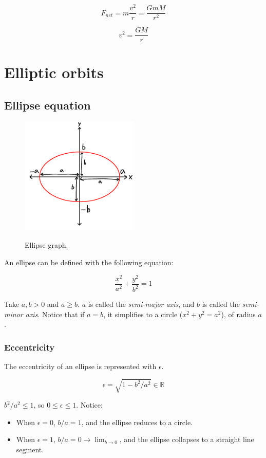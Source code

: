 \documentclass[12pt]{article}
\begin{document}
\[
F_{net} = m\frac{v^2}{r} = \frac{GmM}{r^2}
\]

\[
v^2 = \frac{GM}{r}
\]

\newpage

\section{Elliptic orbits}

\subsection{Ellipse equation}

\begin{figure}[h]
    \centering
    \includegraphics[width=0.5\textwidth]{ellipse_equation}
    \label{fig:ellipseequation}
    \caption{Ellipse graph.}
\end{figure}

An ellipse can be defined with the following equation:

\[
\frac{x^2}{a^2} + \frac{y^2}{b^2} = 1
\]

Take $a,b>0$ and $a \geq b$.
$a$ is called the \emph{semi-major axis}, and $b$ is called the \emph{semi-minor axis}.
Notice that if $a = b$, it simplifies to a circle ($x^2 + y^2 = a^2$), of radius $a$.

\subsubsection{Eccentricity}

The eccentricity of an ellipse is represented with $\epsilon$.

\[
\epsilon = \sqrt{1 - b^2 / a^2} \in \mathbb{R}
\]

$b^2 / a^2 \leq 1$, so $0 \leq \epsilon \leq 1$.
Notice:

\begin{itemize}
	\item When $\epsilon = 0$, $b/a = 1$, and the ellipse reduces to a circle.
	\item When $\epsilon = 1$, $b/a = 0 \longrightarrow \lim_{b \to 0}$, and the ellipse collapses to a straight line segment.
\end{itemize}
\end{document}
